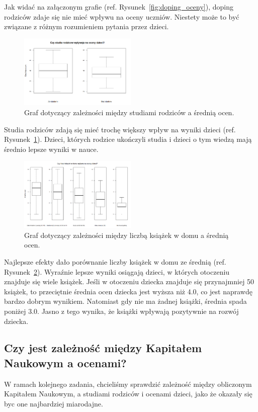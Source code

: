 \documentclass[conference]{IEEEtran}
\begin{document}
Jak widać na załączonym grafie (ref. Rysunek~\ref{fig:doping_oceny}), doping rodziców zdaje się nie mieć wpływu na oceny uczniów. Niestety może to być związane z różnym rozumieniem pytania przez dzieci.

\begin{figure}
	\centering
	\includegraphics[width=0.5\textwidth]{4.png}
	\caption{Graf dotyczący zależności między studiami rodziców a średnią ocen.}
	\label{fig:studia_oceny}
\end{figure}

Studia rodziców zdają się mieć trochę większy wpływ na wyniki dzieci (ref. Rysunek~\ref{fig:studia_oceny}). Dzieci, których rodzice ukończyli studia i dzieci o tym wiedzą mają średnio lepsze wyniki w nauce.

\begin{figure}
	\centering
	\includegraphics[width=0.5\textwidth]{5.png}
	\caption{Graf dotyczący zależności między liczbą książek w domu a średnią ocen.}
	\label{fig:ksiazki_oceny}
\end{figure}

Najlepsze efekty dało porównanie liczby książek w domu ze średnią (ref. Rysunek~\ref{fig:ksiazki_oceny}). Wyraźnie lepsze wyniki osiągają dzieci, w których otoczeniu znajduje się wiele książek. Jeśli w otoczeniu dziecka znajduje się przynajmniej 50 książek, to przeciętnie średnia ocen dziecka jest wyższa niż 4.0, co jest naprawdę bardzo dobrym wynikiem. Natomiast gdy nie ma żadnej książki, średnia spada poniżej 3.0. Jasno z tego wynika, że książki wpływają pozytywnie na rozwój dziecka.

\subsection{Czy jest zależność między Kapitałem Naukowym a ocenami?}
W ramach kolejnego zadania, chcieliśmy sprawdzić zależność między obliczonym Kapitałem Naukowym, a studiami rodziców i ocenami dzieci, jako że okazały się byc one najbardziej miarodajne.
\end{document}
